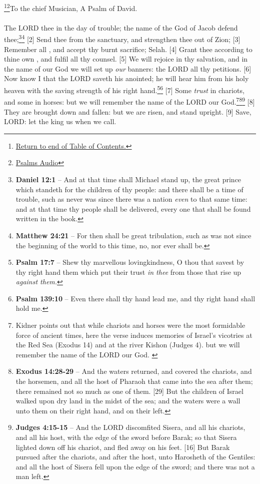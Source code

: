 \footnote{\textcolor[cmyk]{0.99998,1,0,0}{\hyperlink{TOC}{Return to end of Table of Contents.}}}\footnote{\href{https://www.audioverse.org/english/audiobibles/books/ENGKJV/O/Ps/1}{\textcolor[cmyk]{0.99998,1,0,0}{Psalms Audio}}}\textcolor[cmyk]{0.99998,1,0,0}{To the chief Musician, A Psalm of David.}\\
\\
\textcolor[cmyk]{0.99998,1,0,0}{The LORD  thee in the day of trouble; the name of the God of Jacob defend thee;}\footnote{\textbf{Daniel 12:1} -- And at that time shall Michael stand up, the great prince which standeth for the children of thy people: and there shall be a time of trouble, such as never was since there was a nation \emph{even} to that same time: and at that time thy people shall be delivered, every one that shall be found written in the book.}\footnote{\textbf{Matthew 24:21} -- For then shall be great tribulation, such as was not since the beginning of the world to this time, no, nor ever shall be.}
[2] \textcolor[cmyk]{0.99998,1,0,0}{Send thee  from the sanctuary, and strengthen thee out of Zion;}
[3] \textcolor[cmyk]{0.99998,1,0,0}{Remember all , and accept thy burnt sacrifice; Selah.}
[4] \textcolor[cmyk]{0.99998,1,0,0}{Grant thee according to thine own , and fulfil all thy counsel.}
[5] \textcolor[cmyk]{0.99998,1,0,0}{We will rejoice in thy salvation, and in the name of our God we will set up \emph{our} banners: the LORD  all thy petitions.}
[6] \textcolor[cmyk]{0.99998,1,0,0}{Now know I that the LORD saveth his anointed; he will hear him from his holy heaven with the saving strength of his right hand.}\footnote{\textbf{Psalm 17:7} -- Shew thy marvellous lovingkindness, O thou that savest by thy right hand them which put their trust \emph{in thee} from those that rise up \emph{against them.}}\footnote{\textbf{Psalm 139:10} -- Even there shall thy hand lead me, and thy right hand shall hold me.}
[7] \textcolor[cmyk]{0.99998,1,0,0}{Some \emph{trust} in chariots, and some in horses: but we will remember the name of the LORD our God.}\footnote{Kidner points out that while chariots and horses were the most formidable force of ancient times, here the verse induces memories of Israel's vicotries at the Red Sea (Exodus 14) and at the river Kishon (Judges 4). but we will remember the name of the LORD our God. \cite{kidner2014psalmsV1} }\footnote{\textbf{Exodus 14:28-29} -- And the waters returned, and covered the chariots, and the horsemen, and all the host of Pharaoh that came into the sea after them; there remained not so much as one of them. [29] But the children of Israel walked upon dry land in the midst of the sea; and the waters were a wall unto them on their right hand, and on their left.}\footnote{\textbf{Judges 4:15-15} -- And the LORD discomfited Sisera, and all his chariots, and all his host, with the edge of the sword before Barak; so that Sisera lighted down off his chariot, and fled away on his feet. [16] But Barak pursued after the chariots, and after the host, unto Harosheth of the Gentiles: and all the host of Sisera fell upon the edge of the sword; and there was not a man left.} 
[8] \textcolor[cmyk]{0.99998,1,0,0}{They are brought down and fallen: but we are risen, and stand upright.}
[9] \textcolor[cmyk]{0.99998,1,0,0}{Save, LORD: let the king  us when we call.}
